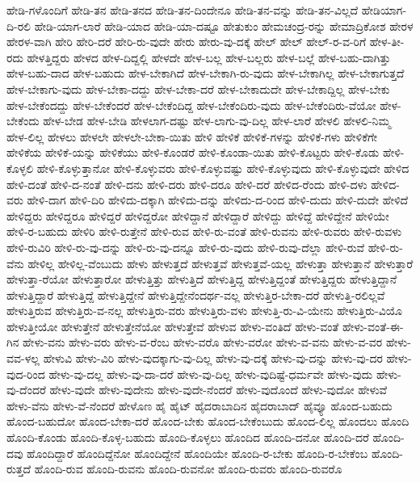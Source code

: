 {ಹೇಡಿ-ಗಳೊಂದಿಗೆ
ಹೇಡಿ-ತನ
ಹೇಡಿ-ತನದ
ಹೇಡಿ-ತನ-ದಿಂದೇನೂ
ಹೇಡಿ-ತನ-ವನ್ನು
ಹೇಡಿ-ತನ-ವಿಲ್ಲದೆ
ಹೇಡಿಯಾಗ-ದಿ-ರಲಿ
ಹೇಡಿ-ಯಾಗ-ಲಾರೆ
ಹೇಡಿ-ಯಾದ
ಹೇಡಿ-ಯಾ-ದಷ್ಟೂ
ಹೇತುಕುಂ
ಹೇಮಚಂದ್ರ-ರನ್ನು
ಹೇಮಾದ್ರಿಕೋಶ
ಹೇರಳ
ಹೇರಳ-ವಾಗಿ
ಹೇರಿ
ಹೇರಿ-ದರೆ
ಹೇರಿ-ರು-ವುದೇ
ಹೇರು
ಹೇರು-ವು-ದಕ್ಕೆ
ಹೇಲ್
ಹೇಲ್‌
ಹೇಲ್‌-ರ-ವ-ರಿಗೆ
ಹೇಳ-ತೀ-ರದು
ಹೇಳತ್ತಿದ್ದರು
ಹೇಳದ
ಹೇಳ-ದಿದ್ದಲ್ಲಿ
ಹೇಳದೇ
ಹೇಳ-ಬಲ್ಲ
ಹೇಳ-ಬಲ್ಲರು
ಹೇಳ-ಬಲ್ಲೆ
ಹೇಳ-ಬಹು-ದಾಗಿತ್ತು
ಹೇಳ-ಬಹು-ದಾದ
ಹೇಳ-ಬಹುದು
ಹೇಳ-ಬೇಕಾಗಿದೆ
ಹೇಳ-ಬೇಕಾಗಿ-ರು-ವುದು
ಹೇಳ-ಬೇಕಾಗಿಲ್ಲ
ಹೇಳ-ಬೇಕಾಗುತ್ತದೆ
ಹೇಳ-ಬೇಕಾಗು-ವುದು
ಹೇಳ-ಬೇಕಾ-ದದ್ದು
ಹೇಳ-ಬೇಕಾ-ದರೆ
ಹೇಳ-ಬೇಕಾದುದೇ
ಹೇಳ-ಬೇಕಾದ್ದಿಲ್ಲ
ಹೇಳ-ಬೇಕು
ಹೇಳ-ಬೇಕೆಂದದ್ದು
ಹೇಳ-ಬೇಕೆಂದರೆ
ಹೇಳ-ಬೇಕೆಂದಿದ್ದ
ಹೇಳ-ಬೇಕೆಂದಿರು-ವುದು
ಹೇಳ-ಬೇಕೆಂದಿರು-ವೆಯೋ
ಹೇಳ-ಬೇಕೆಂದು
ಹೇಳ-ಬೇಡ
ಹೇಳ-ಬೇಡಿ
ಹೇಳಲಾಗ-ದಷ್ಟು
ಹೇಳ-ಲಾಗು-ವು-ದಿಲ್ಲ
ಹೇಳ-ಲಾರೆ
ಹೇಳಲಿ
ಹೇಳಲಿ-ನಿಮ್ಮ
ಹೇಳ-ಲಿಲ್ಲ
ಹೇಳಲು
ಹೇಳಲೇ
ಹೇಳಲೇ-ಬೇಕಾ-ಯಿತು
ಹೇಳಿ
ಹೇಳಿಕೆ
ಹೇಳಿಕೆ-ಗಳನ್ನು
ಹೇಳಿಕೆ-ಗಳು
ಹೇಳಿಕೆಗೇ
ಹೇಳಿಕೆಯ
ಹೇಳಿಕೆ-ಯನ್ನು
ಹೇಳಿಕೆಯು
ಹೇಳಿ-ಕೊಂಡರೆ
ಹೇಳಿ-ಕೊಂಡಾ-ಯಿತು
ಹೇಳಿ-ಕೊಟ್ಟರು
ಹೇಳಿ-ಕೊಡು
ಹೇಳಿ-ಕೊಳ್ಳಲಿ
ಹೇಳಿ-ಕೊಳ್ಳುತ್ತಾನೋ
ಹೇಳಿ-ಕೊಳ್ಳುವರು
ಹೇಳಿ-ಕೊಳ್ಳುವಷ್ಟು
ಹೇಳಿ-ಕೊಳ್ಳುವುದು
ಹೇಳಿ-ಕೊಳ್ಳುವುದೇ
ಹೇಳಿದ
ಹೇಳಿ-ದಂತೆ
ಹೇಳಿ-ದ-ನಂತೆ
ಹೇಳಿ-ದನು
ಹೇಳಿ-ದರು
ಹೇಳಿ-ದರೂ
ಹೇಳಿ-ದರೆ
ಹೇಳಿದ-ರೆಂದು
ಹೇಳಿ-ದಳು
ಹೇಳಿದ-ವರು
ಹೇಳಿ-ದಾಗ
ಹೇಳಿ-ದಿರಿ
ಹೇಳಿದು-ದಕ್ಕಾಗಿ
ಹೇಳಿದು-ದನ್ನು
ಹೇಳಿದು-ದ-ರಿಂದ
ಹೇಳಿ-ದುದು
ಹೇಳಿ-ದುದೇ
ಹೇಳಿದೆ
ಹೇಳಿದ್ದರು
ಹೇಳಿದ್ದರೂ
ಹೇಳಿದ್ದರೆ
ಹೇಳಿದ್ದರೋ
ಹೇಳಿದ್ದಾನೆ
ಹೇಳಿದ್ದಾರೆ
ಹೇಳಿದ್ದು
ಹೇಳಿದ್ದೆ
ಹೇಳಿದ್ದೇನೆ
ಹೇಳಿಯೇ
ಹೇಳಿ-ರ-ಬಹುದು
ಹೇಳಿರಿ
ಹೇಳಿ-ರುತ್ತೇನೆ
ಹೇಳಿ-ರುವ
ಹೇಳಿ-ರು-ವಂತೆ
ಹೇಳಿ-ರುವನು
ಹೇಳಿ-ರುವರು
ಹೇಳಿ-ರುವಳು
ಹೇಳಿ-ರುವಿರಿ
ಹೇಳಿ-ರು-ವು-ದನ್ನು
ಹೇಳಿ-ರು-ವು-ದನ್ನೂ
ಹೇಳಿ-ರು-ವುದು
ಹೇಳಿ-ರುವು-ದೆಲ್ಲಾ
ಹೇಳಿ-ರುವೆ
ಹೇಳಿ-ರು-ವೆನು
ಹೇಳಿಲ್ಲ
ಹೇಳಿಲ್ಲ-ವೆಂಬುದು
ಹೇಳು
ಹೇಳುತ್ತದೆ
ಹೇಳುತ್ತವೆ
ಹೇಳುತ್ತವೆ-ಯಲ್ಲ
ಹೇಳುತ್ತಾ
ಹೇಳುತ್ತಾನೆ
ಹೇಳುತ್ತಾರೆ
ಹೇಳುತ್ತಾ-ರೆಯೋ
ಹೇಳುತ್ತಾರೋ
ಹೇಳುತ್ತಿತ್ತು
ಹೇಳುತ್ತಿದೆ
ಹೇಳುತ್ತಿದ್ದ
ಹೇಳುತ್ತಿದ್ದಂತೆ
ಹೇಳುತ್ತಿದ್ದರು
ಹೇಳುತ್ತಿದ್ದಾನೆ
ಹೇಳುತ್ತಿದ್ದಾರೆ
ಹೇಳುತ್ತಿದ್ದೆ
ಹೇಳುತ್ತಿದ್ದೇನೆ
ಹೇಳುತ್ತಿದ್ದೇನೆಂದರ್ಥ-ವಲ್ಲ
ಹೇಳುತ್ತಿರ-ಬೇಕಾ-ದರೆ
ಹೇಳುತ್ತಿ-ರಲಿಲ್ಲವೆ
ಹೇಳುತ್ತಿರುವ
ಹೇಳುತ್ತಿರು-ವ-ನಲ್ಲ
ಹೇಳುತ್ತಿರು-ವರು
ಹೇಳುತ್ತಿರು-ವಳು
ಹೇಳುತ್ತಿ-ರು-ವಿ-ಯೇನು
ಹೇಳುತ್ತಿರು-ವಿಯೊ
ಹೇಳುತ್ತೀಯೋ
ಹೇಳುತ್ತೇನೆ
ಹೇಳುತ್ತೇನೆಯೋ
ಹೇಳುತ್ತೇವೆ
ಹೇಳುವ
ಹೇಳು-ವಂತಿದೆ
ಹೇಳು-ವಂತೆ
ಹೇಳು-ವಂತೆ-ಈ-ಗಿನ
ಹೇಳು-ವನು
ಹೇಳು-ವರು
ಹೇಳು-ವ-ರೆಂಬ
ಹೇಳು-ವರೊ
ಹೇಳು-ವರೋ
ಹೇಳು-ವ-ವನು
ಹೇಳು-ವ-ವರ
ಹೇಳು-ವವ-ಳಲ್ಲ
ಹೇಳುವಿ
ಹೇಳು-ವಿರಿ
ಹೇಳು-ವುದಕ್ಕಾಗು-ವು-ದಿಲ್ಲ
ಹೇಳು-ವು-ದಕ್ಕೆ
ಹೇಳು-ವು-ದನ್ನು
ಹೇಳು-ವು-ದರ
ಹೇಳು-ವುದ-ರಿಂದ
ಹೇಳು-ವು-ದಲ್ಲ
ಹೇಳು-ವು-ದಾ-ದರೆ
ಹೇಳು-ವು-ದಿಲ್ಲ
ಹೇಳು-ವುದಿಷ್ಟೆ-ಧರ್ಮವೇ
ಹೇಳು-ವುದು
ಹೇಳು-ವು-ದೆಂದರೆ
ಹೇಳು-ವುದೇ
ಹೇಳು-ವುದೇನು
ಹೇಳು-ವುದೇ-ನೆಂದರೆ
ಹೇಳು-ವುದೊಂದೆ
ಹೇಳು-ವುದೋ
ಹೇಳುವೆ
ಹೇಳು-ವೆನು
ಹೇಳು-ವೆ-ನೆಂದರೆ
ಹೇಳೊಣ
ಹೈ
ಹೈಟ್
ಹೈದರಾಬಾದಿನ
ಹೈದರಾಬಾದ್
ಹೈವ್ಯೂ
ಹೊಂದ-ಬಹುದು
ಹೊಂದ-ಬಹುದೋ
ಹೊಂದ-ಬೇಕಾ-ದರೆ
ಹೊಂದ-ಬೇಕು
ಹೊಂದ-ಬೇಕೆಂಬುದು
ಹೊಂದ-ಲಿಲ್ಲ
ಹೊಂದಲು
ಹೊಂದಿ
ಹೊಂದಿ-ಕೊಂಡು
ಹೊಂದಿ-ಕೊಳ್ಳ-ಬಹುದು
ಹೊಂದಿ-ಕೊಳ್ಳಲು
ಹೊಂದಿದ
ಹೊಂದಿ-ದನೋ
ಹೊಂದಿ-ದರೆ
ಹೊಂದಿ-ದವು
ಹೊಂದಿದ್ದಾರೆ
ಹೊಂದಿದ್ದೆನೋ
ಹೊಂದಿದ್ದೇನೆ
ಹೊಂದಿಯೇ
ಹೊಂದಿ-ರ-ಬೇಕು
ಹೊಂದಿ-ರ-ಬೇಕೆಂಬ
ಹೊಂದಿ-ರುತ್ತದೆ
ಹೊಂದಿ-ರುವ
ಹೊಂದಿ-ರುವನು
ಹೊಂದಿ-ರುವನೋ
ಹೊಂದಿ-ರುವರು
ಹೊಂದಿ-ರುವರೊ
}
